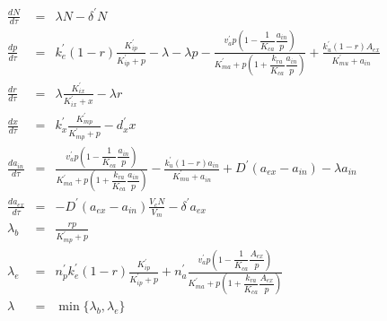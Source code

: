 \documentclass[11pt]{article}
\begin{document}
{\small
\allowdisplaybreaks[1]
\begin{eqnarray}
\frac{dN}{d\tau} &=& \lambda N - \delta^\prime N \label{eq1:dndtau_nd2}\\
\frac{dp}{d\tau} &=& k_e^{\prime}(1-r)\frac{K_{ip}^\prime}{K_{ip}^{\prime}+p}-\lambda-\lambda p-\frac{v_a^{\prime}p\left(1-\dfrac{1}{K_{ca}}\dfrac{a_{in}}{p}\right)}{K_{ma}^{\prime}+p\left(1+\dfrac{k_{ra}}{K_{ca}}\dfrac{a_{in}}{p}\right)} +\frac{k_u^{\prime}(1-r) A_{ex}}{K_{mu}^{\prime}+a_{in}} \label{eq1:dpdtau_nd2}\\
\frac{dr}{d\tau} &=& \lambda\frac{K_{ix}^{\prime}}{K_{ix}^\prime+x}-\lambda r \label{eq:drdtau_nd2}\\
\frac{dx}{d\tau} &=& k_x^{\prime}\frac{K_{mp}^{\prime}}{K_{mp}^{\prime}+p}-d_x^{\prime}x \label{eq:dxdtau_nd2}\\
\frac{da_{in}}{d\tau} &=& \frac{v_a^{\prime}p\left(1-\dfrac{1}{K_{ca}}\dfrac{a_{in}}{p}\right)}{K_{ma}^{\prime}+p\left(1+\dfrac{k_{ra}}{K_{ca}}\dfrac{a_{in}}{p}\right)} -\frac{k_u^{\prime}(1-r) a_{in}}{K_{mu}^{\prime}+a_{in}} +D^\prime(a_{ex}-a_{in})  -\lambda a_{in}\\
\frac{da_{ex}}{d\tau} &=& -D^\prime (a_{ex}-a_{in}) \frac{V_c N}{V_m} - \delta^\prime a_{ex} \\
\lambda_b &=& \frac{rp}{K_{mp}^\prime+p} \\
\lambda_e &=& n_p^{\prime}k_e^{\prime}(1-r)\frac{K_{ip}^\prime}{K_{ip}^{\prime}+p} +n_a^{\prime} \frac{v_a^{\prime}p\left(1-\dfrac{1}{K_{ca}}\dfrac{A_{ex}}{p}\right)}{K_{ma}^{\prime}+p\left(1+\dfrac{k_{ra}}{K_{ca}}\dfrac{A_{ex}}{p}\right)}\\
\lambda &=& \min\{\lambda_b, \lambda_e\}
  \end{eqnarray}
  
}
\end{document}
